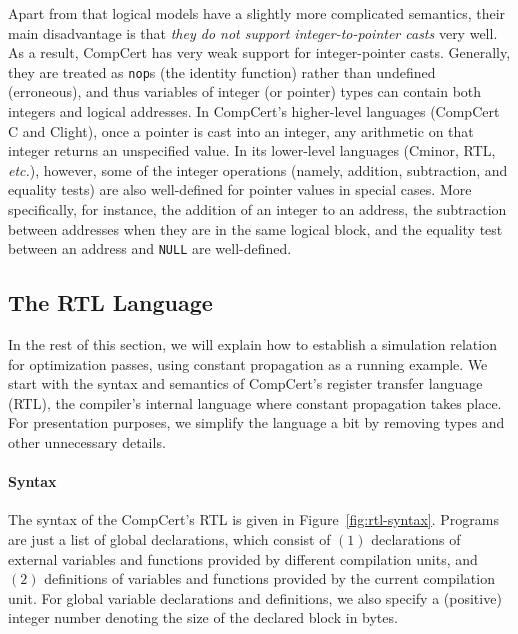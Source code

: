 Apart from that logical models have a slightly more complicated
semantics, their main disadvantage is that \emph{they do not support
  integer-to-pointer casts} very well.
As a result,
CompCert has very weak support for integer-pointer casts.  Generally,
they are treated as \texttt{nop}s (\ie the identity function) rather
than undefined (\ie erroneous), and thus variables of integer (or
pointer) types can contain both integers and logical addresses.  In
CompCert's higher-level languages (CompCert C and Clight), once a
pointer is cast into an integer, any arithmetic on that integer
returns an unspecified value.  In its lower-level languages (Cminor,
RTL, \emph{etc.}), however, some of the integer operations (namely,
addition, subtraction, and equality tests) are also well-defined for
pointer values in special cases.  More specifically, for instance,
the addition of an integer to an address, the
subtraction between addresses when they are in the same logical block,
and the equality test between an address and \texttt{NULL} are well-defined.



\subsection{The RTL Language}
\label{sec:background:rtl}

In the rest of this section, we will explain how to establish a simulation relation for optimization
passes, using constant propagation as a running example.  We start with the syntax and semantics of
CompCert's register transfer language (RTL), the compiler's internal language where constant
propagation takes place.  For presentation purposes, we simplify the language a bit by removing
types and other unnecessary details.


\paragraph{Syntax}



The syntax of the CompCert's RTL is given in Figure~\ref{fig:rtl-syntax}.  Programs are just a list
of global declarations, which consist of $(1)$ declarations of external variables and functions
provided by different compilation units, and $(2)$ definitions of variables and functions provided
by the current compilation unit.  For global variable declarations and definitions, we also specify
a (positive) integer number denoting the size of the declared block in bytes.

